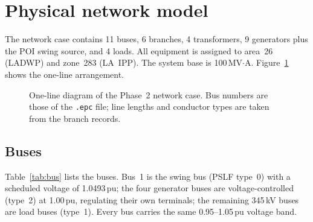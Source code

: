 \section{Physical network model}
\label{sec:network}

The network case contains 11 buses, 6 branches, 4 transformers, 9 generators plus the
POI swing source, and 4 loads. All equipment is assigned to area~26 (LADWP) and
zone~283 (LA~IPP). The system base is 100\,MV$\cdot$A. Figure~\ref{fig:oneline}
shows the one-line arrangement.

\begin{figure}[!ht]
\centering
\resizebox{\linewidth}{!}{%
}
\caption{One-line diagram of the Phase~2 network case. Bus numbers are those of the \texttt{.epc} file; line lengths and conductor types are taken from the branch records.}
\label{fig:oneline}
\end{figure}

\subsection{Buses}

Table~\ref{tab:bus} lists the buses. Bus~1 is the swing bus (PSLF type~0) with a
scheduled voltage of 1.0493\,pu; the four generator buses are voltage-controlled
(type~2) at 1.00\,pu, regulating their own terminals; the remaining 345\,kV buses are
load buses (type~1). Every bus carries the same 0.95--1.05\,pu voltage band.

